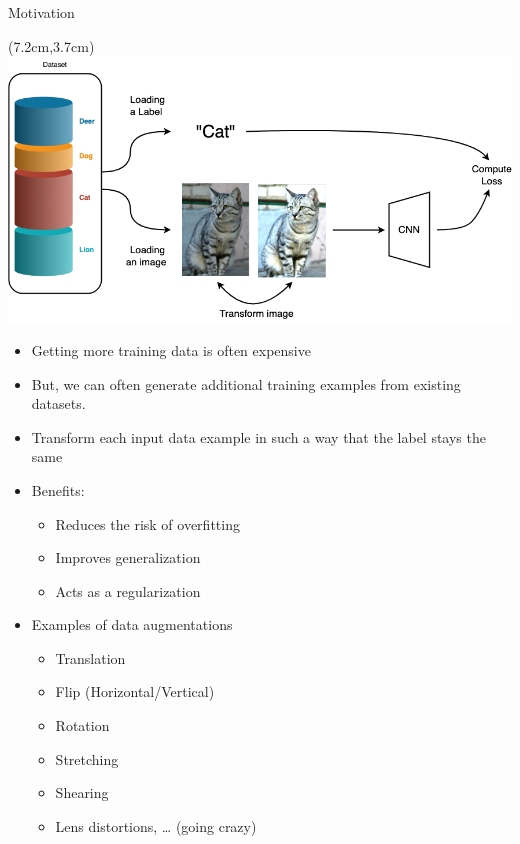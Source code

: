 \documentclass[serif, aspectratio=169]{beamer}
\begin{document}
\begin{frame}{Motivation}
	\begin{textblock*}{5cm}(7.2cm,3.7cm) %
		\includegraphics[keepaspectratio, scale=0.28]{pic/cnnaug}
	\end{textblock*}
	
	\begin{itemize}
		\item Getting more training data is often expensive
		\item But, we can often generate additional training examples from existing datasets.
		\item Transform each input data example in such a way that the label stays the same
		\item Benefits:
		\begin{itemize}
			\item Reduces the risk of overfitting
			\item Improves generalization
			\item Acts as a regularization
		\end{itemize}
		\item Examples of data augmentations
		\begin{itemize}
			\item Translation
			\item Flip (Horizontal/Vertical)
			\item Rotation
			\item Stretching
			\item Shearing
			\item Lens distortions, … (going crazy)
		\end{itemize}
	\end{itemize}
\end{frame}
\end{document}
